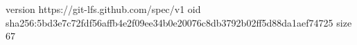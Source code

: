 version https://git-lfs.github.com/spec/v1
oid sha256:5bd3e7c72fdf56affb4e2f09ee34b0e20076c8db3792b02ff5d88da1aef74725
size 67
